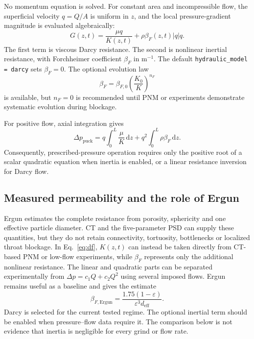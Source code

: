 \documentclass[11pt,a4paper]{article}
\newcommand{\dd}{\,\mathrm d}
\newcommand{\code}[1]{\texttt{#1}}
\begin{document}
No momentum equation is solved. For constant area and incompressible flow, the
superficial velocity $q=Q/A$ is uniform in $z$, and the local pressure-gradient
magnitude is evaluated algebraically:
\begin{equation}
G(z,t)=\frac{\mu q}{K(z,t)}
 +\rho\beta_F(z,t)|q|q. \label{eq:df}
\end{equation}
The first term is viscous Darcy resistance. The second is nonlinear inertial
resistance, with Forchheimer coefficient $\beta_F$ in m$^{-1}$. The default
\code{hydraulic\_model = darcy} sets $\beta_F=0$. The optional evolution law
\begin{equation}
\beta_F=\beta_{F,0}\left(\frac{K_0}{K}\right)^{n_F}
\end{equation}
is available, but $n_F=0$ is recommended until PNM or experiments demonstrate
systematic evolution during blockage.

For positive flow, axial integration gives
\begin{equation}
\Delta p_{\mathrm{puck}}
=q\int_0^L\frac{\mu}{K}\dd z
+q^2\int_0^L\rho\beta_F\dd z. \label{eq:dfintegrated}
\end{equation}
Consequently, prescribed-pressure operation requires only the positive root of
a scalar quadratic equation when inertia is enabled, or a linear resistance
inversion for Darcy flow.

\subsection{Measured permeability and the role of Ergun}

Ergun estimates the complete resistance from porosity, sphericity and one
effective particle diameter. CT and the five-parameter PSD can supply these
quantities, but they do not retain connectivity, tortuosity, bottlenecks or
localized throat blockage. In Eq.~\eqref{eq:df}, $K(z,t)$ can instead be taken
directly from CT-based PNM or low-flow experiments, while $\beta_F$ represents
only the additional nonlinear resistance. The linear and quadratic parts can
be separated experimentally from $\Delta p=c_1Q+c_2Q^2$ using several imposed
flows. Ergun remains useful as a baseline and gives the estimate
\begin{equation}
\beta_{F,\mathrm{Ergun}}=
\frac{1.75(1-\varepsilon)}{\varepsilon^3d_{\mathrm{eff}}}.
\end{equation}
Darcy is selected for the current tested regime. The optional inertial term
should be enabled when pressure--flow data require it. The comparison below
is not evidence that inertia is negligible for every grind or flow rate.
\end{document}
